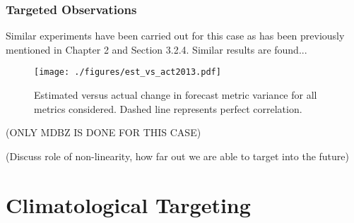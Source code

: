 \documentclass{ttuthes2007}
\newcommand{\tab}{\hspace*{2em}}  %
\begin{document}
\subsection{Targeted Observations}

\tab Similar experiments have been carried out for this case as has been previously mentioned in Chapter 2 and Section 3.2.4. Similar results are found...

\begin{figure}[!tb]
  \centering
  \noindent\texttt{[image: ./figures/est\_vs\_act2013.pdf]}\\
  \caption{Estimated versus actual change in forecast metric variance for all metrics considered. Dashed line represents perfect correlation. }
\label{est_vs_act2013}
\end{figure}

(ONLY MDBZ IS DONE FOR THIS CASE)

(Discuss role of non-linearity, how far out we are able to target into the future)

\chapter{Climatological Targeting}
\end{document}
